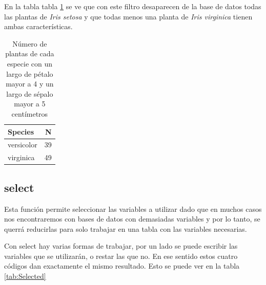 \documentclass[]{book}
\newenvironment{Shaded}{\begin{snugshade}}{\end{snugshade}}
\newcommand{\KeywordTok}[1]{\textcolor[rgb]{0.13,0.29,0.53}{\textbf{#1}}}
\newcommand{\NormalTok}[1]{#1}
\newcommand{\OperatorTok}[1]{\textcolor[rgb]{0.81,0.36,0.00}{\textbf{#1}}}
\newcommand{\StringTok}[1]{\textcolor[rgb]{0.31,0.60,0.02}{#1}}
\begin{document}
En la tabla tabla \ref{tab:Numero} se ve que con este filtro desaparecen
de la base de datos todas las plantas de \emph{Iris setosa} y que todas
menos una planta de \emph{Iris virginica} tienen ambas características.

\begin{table}

\caption{\label{tab:Numero}Número de plantas de cada especie con un largo de pétalo mayor a 4 y un largo de sépalo mayor a 5 centímetros}
\centering
\begin{tabular}[t]{lr}
\toprule
Species & N\\
\midrule
versicolor & 39\\
virginica & 49\\
\bottomrule
\end{tabular}
\end{table}

\hypertarget{select}{%
\subsection{select}\label{select}}

Esta función permite seleccionar las variables a utilizar dado que en
muchos casos nos encontraremos con bases de datos con demasiadas
variables y por lo tanto, se querrá reducirlas para solo trabajar en una
tabla con las variables necesarias.

Con select hay varias formas de trabajar, por un lado se puede escribir
las variables que se utilizarán, o restar las que no. En ese sentido
estos cuatro códigos dan exactamente el mismo resultado. Esto se puede
ver en la tabla \ref{tab:Selected}

\begin{Shaded}
\end{Shaded}

\begin{Shaded}
\end{Shaded}
\end{document}
